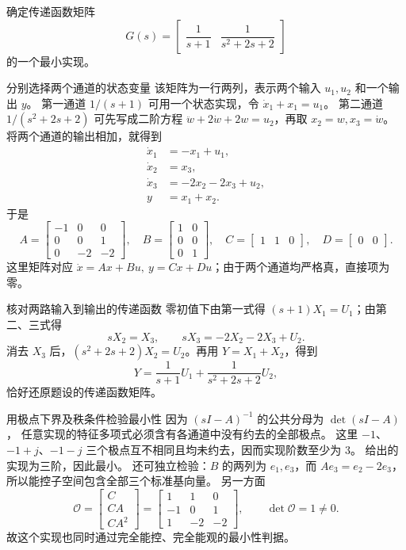 \documentclass[11pt]{article}
\begin{document}
\begin{problem}[原题 6(4)]
确定传递函数矩阵
\[
G(s)=\begin{bmatrix}\dfrac1{s+1}&\dfrac1{s^2+2s+2}\end{bmatrix}
\]
的一个最小实现。
\end{problem}
\begin{solution}
\begin{proofstep}{分别选择两个通道的状态变量}
该矩阵为一行两列，表示两个输入 $u_1,u_2$ 和一个输出 $y$。
第一通道 $1/(s+1)$ 可用一个状态实现，令 $\dot x_1+x_1=u_1$。
第二通道 $1/(s^2+2s+2)$ 可先写成二阶方程
$\ddot w+2\dot w+2w=u_2$，再取 $x_2=w,x_3=\dot w$。
将两个通道的输出相加，就得到
\[
\begin{aligned}
\dot x_1&=-x_1+u_1,\\
\dot x_2&=x_3,\\
\dot x_3&=-2x_2-2x_3+u_2,\\
y&=x_1+x_2.
\end{aligned}
\]
于是
\[
\boxed{A=\begin{bmatrix}-1&0&0\\0&0&1\\0&-2&-2\end{bmatrix},\quad
B=\begin{bmatrix}1&0\\0&0\\0&1\end{bmatrix},\quad
C=\begin{bmatrix}1&1&0\end{bmatrix},\quad D=\begin{bmatrix}0&0\end{bmatrix}.}
\]
这里矩阵对应 $\dot x=Ax+Bu,\ y=Cx+Du$；由于两个通道均严格真，直接项为零。
\end{proofstep}

\begin{proofstep}{核对两路输入到输出的传递函数}
零初值下由第一式得 $(s+1)X_1=U_1$；由第二、三式得
\[
sX_2=X_3,\qquad sX_3=-2X_2-2X_3+U_2.
\]
消去 $X_3$ 后，$(s^2+2s+2)X_2=U_2$。再用 $Y=X_1+X_2$，得到
\[
Y=\frac{1}{s+1}U_1+\frac{1}{s^2+2s+2}U_2,
\]
恰好还原题设的传递函数矩阵。
\end{proofstep}

\begin{proofstep}{用极点下界及秩条件检验最小性}
因为 $(sI-A)^{-1}$ 的公共分母为 $\det(sI-A)$，
任意实现的特征多项式必须含有各通道中没有约去的全部极点。
这里 $-1$、$-1+j$、$-1-j$ 三个极点互不相同且均未约去，因而实现阶数至少为 3。
给出的实现为三阶，因此最小。
还可独立检验：$B$ 的两列为 $e_1,e_3$，而 $Ae_3=e_2-2e_3$，所以能控子空间包含全部三个标准基向量。
另一方面
\[
\mathcal O=\begin{bmatrix}C\\CA\\CA^2\end{bmatrix}
=\begin{bmatrix}1&1&0\\-1&0&1\\1&-2&-2\end{bmatrix},\qquad
\det\mathcal O=1\ne0.
\]
故这个实现也同时通过完全能控、完全能观的最小性判据。
\end{proofstep}
\end{solution}
\end{document}
